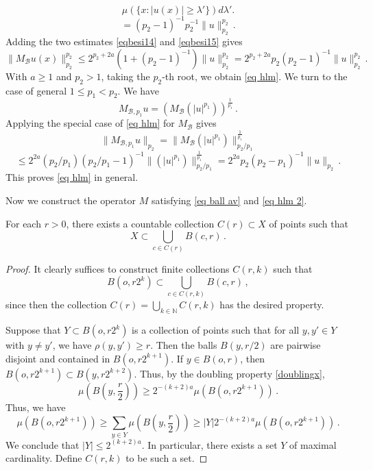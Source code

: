 {\begin{equation}
     \mu (\{x: |u(x)|\ge \lambda'\})
d\lambda'.
\end{equation}
\begin{equation}\label{eqbesi15}
   =(p_2-1)^{-1} p_2^{-1}\|u\|_{p_2}^{p_2}\, .
\end{equation}
Adding the two estimates
\eqref{eqbesi14} and \eqref{eqbesi15} gives
\begin{equation}
    \|M_{\mathcal{B}}u(x)\|_{p_2}^{p_2}
   \le 2^{p_2+2a} (1+(p_2-1)^{-1})\|u\|_{p_2}^{p_2}
   = 2^{p_2+2a} p_2(p_2-1)^{-1}\|u\|_{p_2}^{p_2}
   \, .
   \end{equation}
With $a\ge 1$ and $p_2>1$, taking the $p_2$-th root, we obtain \eqref{eq hlm}.
We turn to the case of general
$1\le p_1<p_2$.
We have
\begin{equation}
    M_{\mathcal{B},p_1}u=(M_{\mathcal{B}} (|u|^{p_1}))^{\frac 1{p_1}}\, .
\end{equation}
Applying the special case of \eqref{eq hlm} for $M_{\mathcal{B}}$ gives
\begin{equation}
    \|M_{\mathcal{B},p_1}u\|_{p_2}=
    \|M_{\mathcal{B}} (|u|^{p_1})\|_{p_2/p_1}^{\frac 1{p_1}}
\end{equation}
\begin{equation}
    \le 2^{2a} (p_2/p_1) (p_2/p_1-1)^{-1}
    \|(|u|^{p_1})\|_{p_2/p_1}^{\frac 1{p_1}}
    =2^{2a} p_2(p_2-p_1)^{-1}\|u\|_{p_2}\, .
\end{equation}
This proves \eqref{eq hlm} in general.

Now we construct the operator $M$ satisfying \eqref{eq ball av} and \eqref{eq hlm 2}.

\begin{lemma}
    \label{lem separable}
    For each $r > 0$, there exists a countable collection $C(r) \subset X$ of points such that
    $$
        X \subset \bigcup_{c \in C(r)} B(c, r)\,.
    $$
\end{lemma}

\begin{proof}
    It clearly suffices to construct finite collections $C(r,k)$ such that
    $$
        B(o, r2^k) \subset \bigcup_{c \in C(r,k)} B(c,r)\,,
    $$
    since then the collection $C(r) = \bigcup_{k \in \mathbb{N}} C(r,k)$ has the desired property.

    Suppose that $Y \subset B(o, r2^k)$ is a collection of points such that for all $y, y' \in Y$ with $y \ne y'$, we have $\rho(y,y') \ge r$. Then the balls $B(y, r/2)$ are pairwise disjoint and contained in $B(o, r2^{k+1})$. If $y \in B(o, r)$, then $B(o, r2^{k+1}) \subset B(y, r2^{k+2})$. Thus, by the doubling property \eqref{doublingx},
    $$
        \mu(B(y, \frac{r}{2})) \ge 2^{-(k+2)a} \mu(B(o, r2^{k+1}))\,.
    $$
    Thus, we have
    $$
        \mu(B(o, r2^{k+1})) \ge \sum_{y \in Y} \mu(B(y, \frac{r}{2})) \ge |Y| 2^{-(k+2)a} \mu(B(o, r2^{k+1}))\,.
    $$
    We conclude that $|Y| \le 2^{(k+2)a}$. In particular, there exists a set $Y$ of maximal cardinality. Define $C(r,k)$ to be such a set.


\end{proof}}

